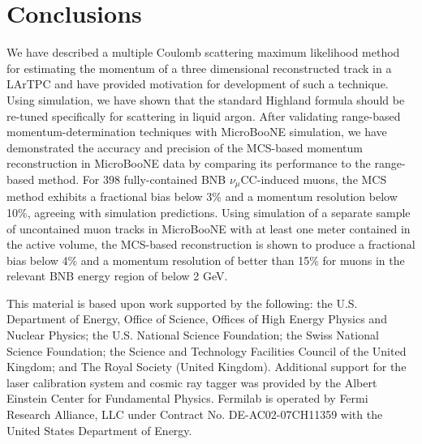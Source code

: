 \documentclass[a4paper,11pt]{article}
\begin{document}







\section{Conclusions}
We have described a multiple Coulomb scattering maximum likelihood method for estimating the momentum of a three dimensional reconstructed track in a LArTPC and have provided motivation for development of such a technique. Using simulation, we have shown that the standard Highland formula should be re-tuned specifically for scattering in liquid argon. After validating range-based momentum-determination techniques with MicroBooNE simulation, we have demonstrated the accuracy and precision of the MCS-based momentum reconstruction in MicroBooNE data by comparing its performance to the range-based method. For 398 fully-contained BNB $\nu_\mu$CC-induced muons, the MCS method exhibits a fractional bias below 3\% and a momentum resolution below 10\%, agreeing with simulation predictions. Using simulation of a separate sample of uncontained muon tracks in MicroBooNE with at least one meter contained in the active volume, the MCS-based reconstruction is shown to produce a fractional bias below 4\% and a momentum resolution of better than 15\% for muons in the relevant BNB energy region of below 2 GeV.

\acknowledgments
This material is based upon work supported by the following: the U.S. Department of Energy, Office of Science, Offices of High Energy Physics and Nuclear Physics; the U.S. National Science Foundation; the Swiss National Science Foundation; the Science and Technology Facilities Council of the United Kingdom; and The Royal Society (United Kingdom). Additional support for the laser calibration system and cosmic ray tagger was provided by the Albert Einstein Center for Fundamental Physics. Fermilab is operated by Fermi Research Alliance, LLC under Contract No. DE-AC02-07CH11359 with the United States Department of Energy.
\end{document}
